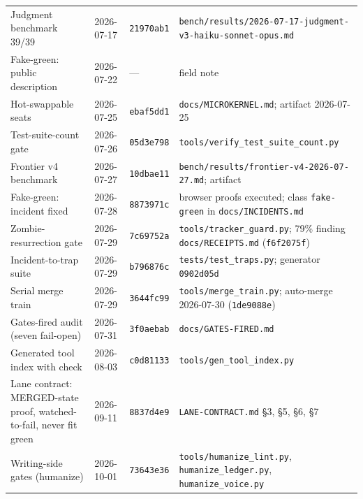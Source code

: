 \documentclass[11pt]{article}
\newcommand{\sha}[1]{\texttt{\small #1}}
\newcommand{\file}[1]{\texttt{\small #1}}
\begin{document}
\begin{longtable}{P{3.6cm}P{2.3cm}P{2.3cm}P{6.2cm}}
Judgment benchmark 39/39 & 2026-07-17 & \sha{21970ab1} & \file{bench/results/2026-07-17-judgment-v3-haiku-sonnet-opus.md} \\
Fake-green: public description & 2026-07-22 & --- & field note \cite{green} \\
Hot-swappable seats & 2026-07-25 & \sha{ebaf5dd1} & \file{docs/MICROKERNEL.md}; artifact 2026-07-25 \cite{seats} \\
Test-suite-count gate & 2026-07-26 & \sha{05d3e798} & \file{tools/verify\_test\_suite\_count.py} \\
Frontier v4 benchmark & 2026-07-27 & \sha{10dbae11} & \file{bench/results/frontier-v4-2026-07-27.md}; artifact \cite{frontier} \\
Fake-green: incident fixed & 2026-07-28 & \sha{8873971c} & browser proofs executed; class \texttt{fake-green} in \file{docs/INCIDENTS.md} \\
Zombie-resurrection gate & 2026-07-29 & \sha{7c69752a} & \file{tools/tracker\_guard.py}; 79\% finding \file{docs/RECEIPTS.md} (\sha{f6f2075f}) \\
Incident-to-trap suite & 2026-07-29 & \sha{b796876c} & \file{tests/test\_traps.py}; generator \sha{0902d05d} \\
Serial merge train & 2026-07-29 & \sha{3644fc99} & \file{tools/merge\_train.py}; auto-merge 2026-07-30 (\sha{1de9088e}) \\
Gates-fired audit (seven fail-open) & 2026-07-31 & \sha{3f0aebab} & \file{docs/GATES-FIRED.md} \\
Generated tool index with check & 2026-08-03 & \sha{c0d81133} & \file{tools/gen\_tool\_index.py} \\
Lane contract: MERGED-state proof, watched-to-fail, never fit green & 2026-09-11 & \sha{8837d4e9} & \file{LANE-CONTRACT.md} \S3, \S5, \S6, \S7 \\
Writing-side gates (humanize) & 2026-10-01 & \sha{73643e36} & \file{tools/humanize\_lint.py}, \file{humanize\_ledger.py}, \file{humanize\_voice.py} \\
\bottomrule
\end{longtable}
\end{document}
